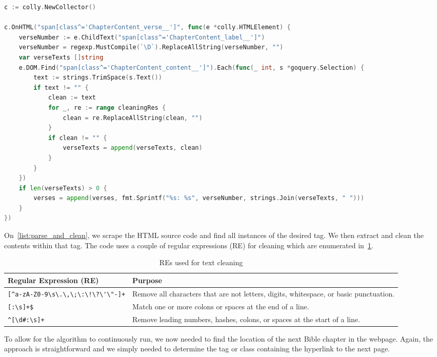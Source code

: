 \documentclass{article}
\begin{document}
\begin{lstlisting}[language=Go, caption={Parsing and Cleaning Step}, label={list:parse_and_clean}]
c := colly.NewCollector()

c.OnHTML("span[class^='ChapterContent_verse__']", func(e *colly.HTMLElement) {
    verseNumber := e.ChildText("span[class^='ChapterContent_label__']")
    verseNumber = regexp.MustCompile(`\D`).ReplaceAllString(verseNumber, "")
    var verseTexts []string
    e.DOM.Find("span[class^='ChapterContent_content__']").Each(func(_ int, s *goquery.Selection) {
        text := strings.TrimSpace(s.Text())
        if text != "" {
            clean := text
            for _, re := range cleaningRes {
                clean = re.ReplaceAllString(clean, "")
            }
            if clean != "" {
                verseTexts = append(verseTexts, clean)
            }
        }
    })
    if len(verseTexts) > 0 {
        verses = append(verses, fmt.Sprintf("%s: %s", verseNumber, strings.Join(verseTexts, " ")))
    }
})
\end{lstlisting}

On~\cref{list:parse_and_clean}, we scrape the HTML source code and find all
instances of the desired tag. We then extract and clean the contents within
that tag. The code uses a couple of regular expressions (RE) for cleaning which are
enumerated in~\cref{tab:regex}.

\begin{table}[h!]
    \centering
    \begin{tabular}{p{} p{}}
        \hline
        \textbf{Regular Expression (RE)} & \textbf{Purpose} \\
        \hline
        \verb|[^a-zA-Z0-9\s\.\,\;\:\!\?\'\"-]+| & Remove all characters that are not letters, digits, whitespace, or basic punctuation. \\
        \verb|[:\s]+$| & Match one or more colons or spaces at the end of a line. \\
        \verb|^[\d#:\s]+| & Remove leading numbers, hashes, colons, or spaces at the start of a line. \\
        \hline
    \end{tabular}
    \caption{REs used for text cleaning}\label{tab:regex}
\end{table}

To allow for the algorithm to continuously run, we now needed to find the location of
the next Bible chapter in the webpage. Again, the approach is straightforward and we 
simply needed to determine the tag or class containing the hyperlink to the next page.
\end{document}
